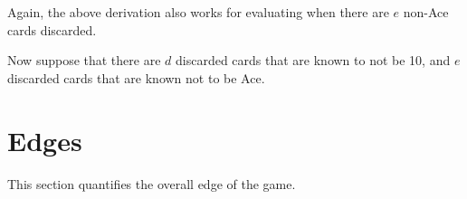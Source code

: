 Again, the above derivation also works for evaluating
when there are $e$ non-Ace cards discarded.

Now suppose that there are $d$ discarded cards that are known to not be 10,
and $e$ discarded cards that are known not to be Ace.

\section{Edges}
\label{sec:basic:edges}

This section quantifies the overall edge of the game.

